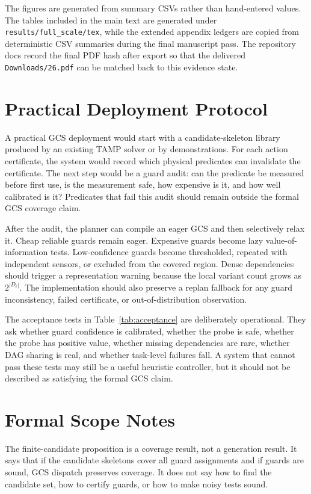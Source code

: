 \documentclass{article}
\begin{document}
The figures are generated from summary CSVs rather than hand-entered values. The tables included in the main text are generated under \texttt{results/full\_scale/tex}, while the extended appendix ledgers are copied from deterministic CSV summaries during the final manuscript pass. The repository docs record the final PDF hash after export so that the delivered \texttt{Downloads/26.pdf} can be matched back to this evidence state.

\section{Practical Deployment Protocol}
A practical GCS deployment would start with a candidate-skeleton library produced by an existing TAMP solver or by demonstrations. For each action certificate, the system would record which physical predicates can invalidate the certificate. The next step would be a guard audit: can the predicate be measured before first use, is the measurement safe, how expensive is it, and how well calibrated is it? Predicates that fail this audit should remain outside the formal GCS coverage claim.

After the audit, the planner can compile an eager GCS and then selectively relax it. Cheap reliable guards remain eager. Expensive guards become lazy value-of-information tests. Low-confidence guards become thresholded, repeated with independent sensors, or excluded from the covered region. Dense dependencies should trigger a representation warning because the local variant count grows as $2^{|D_t|}$. The implementation should also preserve a replan fallback for any guard inconsistency, failed certificate, or out-of-distribution observation.

The acceptance tests in Table~\ref{tab:acceptance} are deliberately operational. They ask whether guard confidence is calibrated, whether the probe is safe, whether the probe has positive value, whether missing dependencies are rare, whether DAG sharing is real, and whether task-level failures fall. A system that cannot pass these tests may still be a useful heuristic controller, but it should not be described as satisfying the formal GCS claim.

\section{Formal Scope Notes}
The finite-candidate proposition is a coverage result, not a generation result. It says that if the candidate skeletons cover all guard assignments and if guards are sound, GCS dispatch preserves coverage. It does not say how to find the candidate set, how to certify guards, or how to make noisy tests sound.
\end{document}
